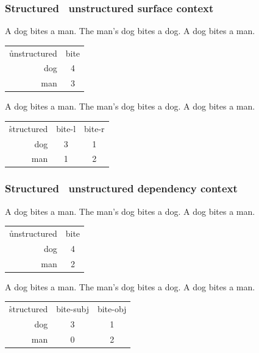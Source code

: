 \begin{frame}
  \frametitle{Structured \vs\ unstructured surface context}

  A dog bites a man. The man's dog bites a dog.  A dog bites a man.
  
 \begin{center}
    \begin{tabular}{r|c}
      \h{unstructured} &  bite \\
      dog & 4 \\
      man & 3 
    \end{tabular}
  \end{center}

  \gap[2]\pause
  A dog bites a man. The man's dog bites a dog.  A dog bites a man.
  
  \begin{center}
    \begin{tabular}{r|c|c}
      \h{structured} &  bite-l & bite-r \\
      dog & 3 & 1 \\
      man & 1  & 2
    \end{tabular}
  \end{center}
\end{frame}


\begin{frame}
  \frametitle{Structured \vs\ unstructured dependency context}

  A dog bites a man. The man's dog bites a dog.  A dog bites a man.
  
  \begin{center}
    \begin{tabular}{r|c}
      \h{unstructured} &  bite \\
      dog & 4 \\
      man & 2 
    \end{tabular}
  \end{center}

  \gap[2]\pause
  A dog bites a man. The man's dog bites a dog.  A dog bites a man.
  
   \begin{center}
     \begin{tabular}{r|c|c}
       \h{structured} &  bite-subj & bite-obj \\
       dog & 3 & 1 \\
       man & 0  & 2
     \end{tabular}
   \end{center}
\end{frame}


